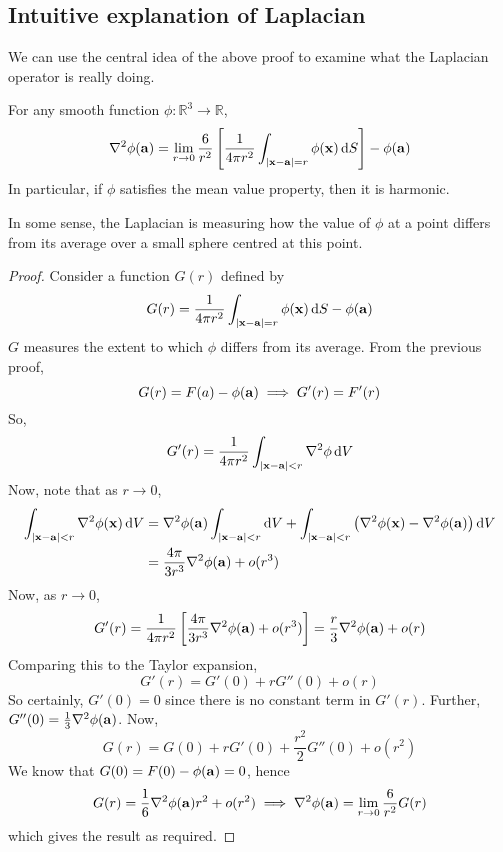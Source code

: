 \subsection{Intuitive explanation of Laplacian}
We can use the central idea of the above proof to examine what the Laplacian operator is really doing.
\begin{proposition}
	For any smooth function \(\phi \colon \mathbb R^3 \to \mathbb R\),
	\[
		\laplacian\phi(\vb a) = \lim_{r \to 0} \frac{6}{r^2} \left[ \frac{1}{4\pi r^2} \int_{\abs{\vb x - \vb a} = r} \phi(\vb x) \dd{S} \right] - \phi(\vb a)
	\]
	In particular, if \(\phi\) satisfies the mean value property, then it is harmonic.
\end{proposition}
\noindent In some sense, the Laplacian is measuring how the value of \(\phi\) at a point differs from its average over a small sphere centred at this point.
\begin{proof}
	Consider a function \(G(r)\) defined by
	\[
		G(r) = \frac{1}{4\pi r^2} \int_{\abs{\vb x - \vb a} = r} \phi(\vb x) \dd{S} - \phi(\vb a)
	\]
	\(G\) measures the extent to which \(\phi\) differs from its average.
	From the previous proof,
	\[
		G(r) = F(a) - \phi(\vb a) \implies G'(r) = F'(r)
	\]
	So,
	\[
		G'(r) = \frac{1}{4\pi r^2} \int_{\abs{\vb x - \vb a} < r} \laplacian{\phi} \dd{V}
	\]
	Now, note that as \(r \to 0\),
	\begin{align*}
		\int_{\abs{\vb x - \vb a} < r} \laplacian \phi(\vb x) \dd{V} & = \laplacian\phi(\vb a) \int_{\abs{\vb x - \vb a} < r} \dd{V} + \int_{\abs{\vb x - \vb a} < r} \left( \laplacian\phi(\vb x) - \laplacian\phi(\vb a) \right) \dd{V} \\
		                                                             & = \frac{4\pi}{3r^3} \laplacian\phi(\vb a) + o(r^3)
	\end{align*}
	Now, as \(r \to 0\),
	\[
		G'(r) = \frac{1}{4\pi r^2} \left[ \frac{4\pi}{3r^3} \laplacian\phi(\vb a) + o(r^3) \right] = \frac{r}{3}\laplacian\phi(\vb a) + o(r)
	\]
	Comparing this to the Taylor expansion,
	\[
		G'(r) = G'(0) + rG''(0) + o(r)
	\]
	So certainly, \(G'(0) = 0\) since there is no constant term in \(G'(r)\).
	Further, \(G''(0) = \frac{1}{3}\laplacian\phi(\vb a)\).
	Now,
	\[
		G(r) = G(0) + rG'(0) + \frac{r^2}{2}G''(0) + o(r^2)
	\]
	We know that \(G(0) = F(0) - \phi(\vb a) = 0\), hence
	\[
		G(r) = \frac{1}{6}\laplacian\phi(\vb a) r^2 + o(r^2) \implies \laplacian\phi(\vb a) = \lim_{r \to 0} \frac{6}{r^2}G(r)
	\]
	which gives the result as required.
\end{proof}


